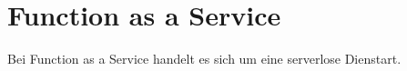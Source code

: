 \section{Function as a Service}
Bei Function as a Service handelt es sich um eine serverlose Dienstart.








